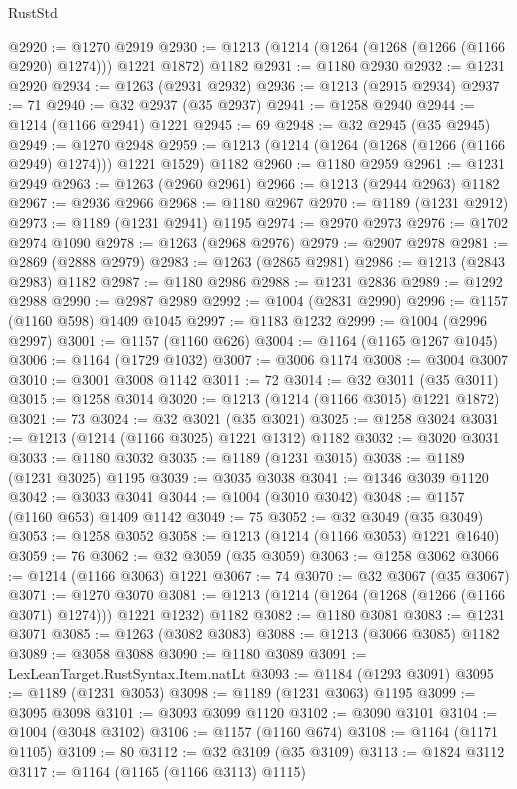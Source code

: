 \begin{lexlean}{RustStd}
\begin{coremodule}
@2920 := @1270 @2919
@2930 := @1213 (@1214 (@1264 (@1268 (@1266 (@1166 @2920) @1274))) @1221 @1872) @1182
@2931 := @1180 @2930
@2932 := @1231 @2920
@2934 := @1263 (@2931 @2932)
@2936 := @1213 (@2915 @2934)
@2937 := 71
@2940 := @32 @2937 (@35 @2937)
@2941 := @1258 @2940
@2944 := @1214 (@1166 @2941) @1221
@2945 := 69
@2948 := @32 @2945 (@35 @2945)
@2949 := @1270 @2948
@2959 := @1213 (@1214 (@1264 (@1268 (@1266 (@1166 @2949) @1274))) @1221 @1529) @1182
@2960 := @1180 @2959
@2961 := @1231 @2949
@2963 := @1263 (@2960 @2961)
@2966 := @1213 (@2944 @2963) @1182
@2967 := @2936 @2966
@2968 := @1180 @2967
@2970 := @1189 (@1231 @2912)
@2973 := @1189 (@1231 @2941) @1195
@2974 := @2970 @2973
@2976 := @1702 @2974 @1090
@2978 := @1263 (@2968 @2976)
@2979 := @2907 @2978
@2981 := @2869 (@2888 @2979)
@2983 := @1263 (@2865 @2981)
@2986 := @1213 (@2843 @2983) @1182
@2987 := @1180 @2986
@2988 := @1231 @2836
@2989 := @1292 @2988
@2990 := @2987 @2989
@2992 := @1004 (@2831 @2990)
@2996 := @1157 (@1160 @598) @1409 @1045
@2997 := @1183 @1232
@2999 := @1004 (@2996 @2997)
@3001 := @1157 (@1160 @626)
@3004 := @1164 (@1165 @1267 @1045)
@3006 := @1164 (@1729 @1032)
@3007 := @3006 @1174
@3008 := @3004 @3007
@3010 := @3001 @3008 @1142
@3011 := 72
@3014 := @32 @3011 (@35 @3011)
@3015 := @1258 @3014
@3020 := @1213 (@1214 (@1166 @3015) @1221 @1872)
@3021 := 73
@3024 := @32 @3021 (@35 @3021)
@3025 := @1258 @3024
@3031 := @1213 (@1214 (@1166 @3025) @1221 @1312) @1182
@3032 := @3020 @3031
@3033 := @1180 @3032
@3035 := @1189 (@1231 @3015)
@3038 := @1189 (@1231 @3025) @1195
@3039 := @3035 @3038
@3041 := @1346 @3039 @1120
@3042 := @3033 @3041
@3044 := @1004 (@3010 @3042)
@3048 := @1157 (@1160 @653) @1409 @1142
@3049 := 75
@3052 := @32 @3049 (@35 @3049)
@3053 := @1258 @3052
@3058 := @1213 (@1214 (@1166 @3053) @1221 @1640)
@3059 := 76
@3062 := @32 @3059 (@35 @3059)
@3063 := @1258 @3062
@3066 := @1214 (@1166 @3063) @1221
@3067 := 74
@3070 := @32 @3067 (@35 @3067)
@3071 := @1270 @3070
@3081 := @1213 (@1214 (@1264 (@1268 (@1266 (@1166 @3071) @1274))) @1221 @1232) @1182
@3082 := @1180 @3081
@3083 := @1231 @3071
@3085 := @1263 (@3082 @3083)
@3088 := @1213 (@3066 @3085) @1182
@3089 := @3058 @3088
@3090 := @1180 @3089
@3091 := LexLeanTarget.RustSyntax.Item.natLt
@3093 := @1184 (@1293 @3091)
@3095 := @1189 (@1231 @3053)
@3098 := @1189 (@1231 @3063) @1195
@3099 := @3095 @3098
@3101 := @3093 @3099 @1120
@3102 := @3090 @3101
@3104 := @1004 (@3048 @3102)
@3106 := @1157 (@1160 @674)
@3108 := @1164 (@1171 @1105)
@3109 := 80
@3112 := @32 @3109 (@35 @3109)
@3113 := @1824 @3112
@3117 := @1164 (@1165 (@1166 @3113) @1115)

\end{coremodule}
\end{lexlean}
